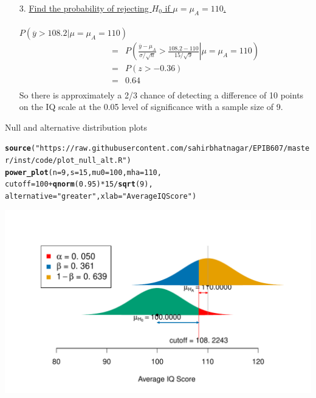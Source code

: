 \documentclass[10pt,handout]{beamer}\usepackage[]{graphicx}\usepackage[]{color}
\makeatletter
\def\maxwidth{ %
  \ifdim\Gin@nat@width>\linewidth
    \linewidth
  \else
    \Gin@nat@width
  \fi
}
\newcommand{\hlnum}[1]{\textcolor[rgb]{0.686,0.059,0.569}{#1}}%
\newcommand{\hlstr}[1]{\textcolor[rgb]{0.192,0.494,0.8}{#1}}%
\newcommand{\hlopt}[1]{\textcolor[rgb]{0,0,0}{#1}}%
\newcommand{\hlstd}[1]{\textcolor[rgb]{0.345,0.345,0.345}{#1}}%
\newcommand{\hlkwc}[1]{\textcolor[rgb]{0.333,0.667,0.333}{#1}}%
\newcommand{\hlkwd}[1]{\textcolor[rgb]{0.737,0.353,0.396}{\textbf{#1}}}%
\newenvironment{kframe}{%
 \def\at@end@of@kframe{}%
 \ifinner\ifhmode%
  \def\at@end@of@kframe{\end{minipage}}%
  \begin{minipage}{\columnwidth}%
 \fi\fi%
 \def\FrameCommand##1{\hskip\@totalleftmargin \hskip-\fboxsep
 \colorbox{shadecolor}{##1}\hskip-\fboxsep
     \hskip-\linewidth \hskip-\@totalleftmargin \hskip\columnwidth}%
 \MakeFramed {\advance\hsize-\width
   \@totalleftmargin\z@ \linewidth\hsize
   \@setminipage}}%
 {\par\unskip\endMakeFramed%
 \at@end@of@kframe}
\newenvironment{knitrout}{}{} %
\makeatother
\begin{document}
{	\begin{enumerate}
		\item[3.] \underline{Find the probability of rejecting $H_0$ if
			$\mu=\mu_A=110$.}\\ \ \\
		$P(\overline{y} > 108.2|\mu=\mu_A=110) $
		\begin{eqnarray*} \qquad \qquad & = &
			P\left(\left.\frac{\overline{y}-\mu_A}{\sigma/\sqrt{n}}
			> \frac{108.2-110}{15/\sqrt{9}}\right|\mu=\mu_A=110\right)\\
			& = & P\left(z > -0.36\right)\\
			& = & 0.64\\
		\end{eqnarray*}
		So there is approximately a 2/3 chance of detecting a difference of
		10 points on the IQ scale at the 0.05 level of significance with a
		sample size of 9.
	\end{enumerate}
} 


\begin{frame}[fragile]{Null and alternative distribution plots}
\begin{knitrout}\tiny
{}\color{fgcolor}\begin{kframe}
\begin{alltt}
\hlkwd{source}\hlstd{(}\hlstr{"https://raw.githubusercontent.com/sahirbhatnagar/EPIB607/master/inst/code/plot_null_alt.R"}\hlstd{)}
\hlkwd{power_plot}\hlstd{(}\hlkwc{n} \hlstd{=} \hlnum{9}\hlstd{,} \hlkwc{s} \hlstd{=} \hlnum{15}\hlstd{,} \hlkwc{mu0} \hlstd{=} \hlnum{100}\hlstd{,} \hlkwc{mha} \hlstd{=} \hlnum{110}\hlstd{,}
\hlkwc{cutoff} \hlstd{=} \hlnum{100} \hlopt{+} \hlkwd{qnorm}\hlstd{(}\hlnum{0.95}\hlstd{)} \hlopt{*} \hlnum{15} \hlopt{/} \hlkwd{sqrt}\hlstd{(}\hlnum{9}\hlstd{),}
\hlkwc{alternative} \hlstd{=} \hlstr{"greater"}\hlstd{,} \hlkwc{xlab} \hlstd{=} \hlstr{"Average IQ Score"}\hlstd{)}
\end{alltt}
\end{kframe}

{\centering \includegraphics[width=\maxwidth]{figure/unnamed-chunk-18-1} 

}


\end{knitrout}
\end{frame}
\end{document}
